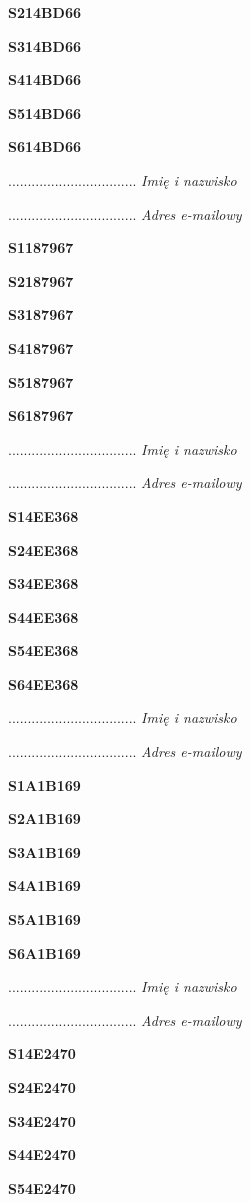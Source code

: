 \Large \textbf{S214BD66}

\Large \textbf{S314BD66}

\Large \textbf{S414BD66}

\Large \textbf{S514BD66}

\Large \textbf{S614BD66}

.................................
\textit{Imię i nazwisko}

.................................
\textit{Adres e-mailowy}

\Large \textbf{S1187967}

\Large \textbf{S2187967}

\Large \textbf{S3187967}

\Large \textbf{S4187967}

\Large \textbf{S5187967}

\Large \textbf{S6187967}

.................................
\textit{Imię i nazwisko}

.................................
\textit{Adres e-mailowy}

\Large \textbf{S14EE368}

\Large \textbf{S24EE368}

\Large \textbf{S34EE368}

\Large \textbf{S44EE368}

\Large \textbf{S54EE368}

\Large \textbf{S64EE368}

.................................
\textit{Imię i nazwisko}

.................................
\textit{Adres e-mailowy}

\Large \textbf{S1A1B169}

\Large \textbf{S2A1B169}

\Large \textbf{S3A1B169}

\Large \textbf{S4A1B169}

\Large \textbf{S5A1B169}

\Large \textbf{S6A1B169}

.................................
\textit{Imię i nazwisko}

.................................
\textit{Adres e-mailowy}

\Large \textbf{S14E2470}

\Large \textbf{S24E2470}

\Large \textbf{S34E2470}

\Large \textbf{S44E2470}

\Large \textbf{S54E2470}

